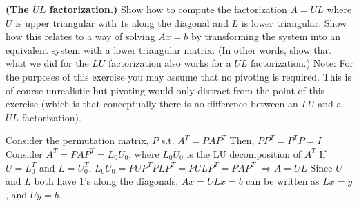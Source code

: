 \textbf{(The $UL$ factorization.)} Show how to compute the
factorization $A = UL$ where $U$ is upper triangular with $1$s along
the diagonal and $L$ is lower triangular. Show how this relates to a
way of solving $Ax=b$ by transforming the system into an equivalent
system with a lower triangular matrix. (In other words, show that what
we did for the $LU$ factorization also works for a $UL$
factorization.) Note: For the purposes of this exercise you may assume
that no pivoting is required. This is of course unrealistic but
pivoting would only distract from the point of this exercise (which is
that conceptually there is no difference between an $LU$ and a $UL$
factorization).

{\color{blue}
Consider the permutation matrix, $P$ s.t.
$A^{T}=PAP^{T}$
Then, $PP^{T}=P^{T}P=I$
Consider $A^{T}=PAP^{T}=L_0U_0$, where $L_0U_0$ is the LU decomposition of $A^{T}$
If $U=L_{0}^{T}$ and $L=U_{0}^{T}$, $L_0U_0=PUP^{T}PLP^{T}=PULP^{T}=PAP^{T}$
$\Rightarrow A=UL$ Since $U$ and $L$ both have $1$'s along the diagonals,
$Ax=ULx=b$ can be written as $Lx=y$, and $Uy=b$.


}
